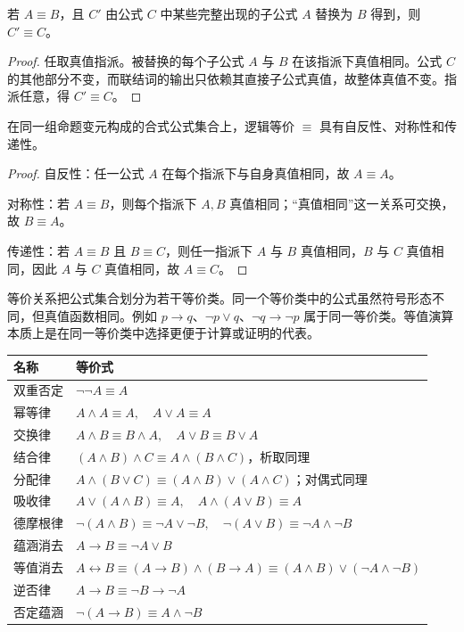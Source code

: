 \begin{theorem}[等价替换定理]\label{ch1-replacement}
若 $A\equiv B$，且 $C'$ 由公式 $C$ 中某些完整出现的子公式 $A$ 替换为 $B$ 得到，则 $C'\equiv C$。
\end{theorem}
\begin{proof}
任取真值指派。被替换的每个子公式 $A$ 与 $B$ 在该指派下真值相同。公式 $C$ 的其他部分不变，而联结词的输出只依赖其直接子公式真值，故整体真值不变。指派任意，得 $C'\equiv C$。
\end{proof}

\begin{theorem}[逻辑等价是等价关系]\label{ch1-equiv-relation}
在同一组命题变元构成的合式公式集合上，逻辑等价 $\equiv$ 具有自反性、对称性和传递性。
\end{theorem}
\begin{proof}
自反性：任一公式 $A$ 在每个指派下与自身真值相同，故 $A\equiv A$。

对称性：若 $A\equiv B$，则每个指派下 $A,B$ 真值相同；“真值相同”这一关系可交换，故 $B\equiv A$。

传递性：若 $A\equiv B$ 且 $B\equiv C$，则任一指派下 $A$ 与 $B$ 真值相同，$B$ 与 $C$ 真值相同，因此 $A$ 与 $C$ 真值相同，故 $A\equiv C$。
\end{proof}

等价关系把公式集合划分为若干等价类。同一个等价类中的公式虽然符号形态不同，但真值函数相同。例如 $p\to q$、$\neg p\lor q$、$\neg q\to\neg p$ 属于同一等价类。等值演算本质上是在同一等价类中选择更便于计算或证明的代表。

\begin{center}\small
\begin{tabularx}{\textwidth}{lX}
\toprule
名称 & 等价式\\
\midrule
双重否定 & $\neg\neg A\equiv A$\\
幂等律 & $A\land A\equiv A,\quad A\lor A\equiv A$\\
交换律 & $A\land B\equiv B\land A,\quad A\lor B\equiv B\lor A$\\
结合律 & $(A\land B)\land C\equiv A\land(B\land C)$，析取同理\\
分配律 & $A\land(B\lor C)\equiv(A\land B)\lor(A\land C)$；对偶式同理\\
吸收律 & $A\lor(A\land B)\equiv A,\quad A\land(A\lor B)\equiv A$\\
德摩根律 & $\neg(A\land B)\equiv\neg A\lor\neg B,\quad \neg(A\lor B)\equiv\neg A\land\neg B$\\
蕴涵消去 & $A\to B\equiv\neg A\lor B$\\
等值消去 & $A\leftrightarrow B\equiv(A\to B)\land(B\to A)\equiv(A\land B)\lor(\neg A\land\neg B)$\\
逆否律 & $A\to B\equiv\neg B\to\neg A$\\
否定蕴涵 & $\neg(A\to B)\equiv A\land\neg B$\\
\bottomrule
\end{tabularx}
\end{center}

